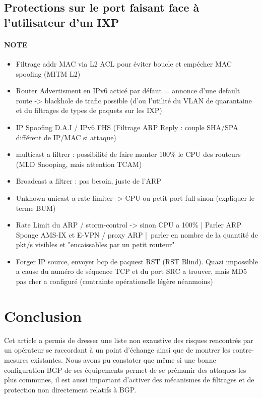 \subsection{Protections sur le port faisant face à l'utilisateur d'un IXP}

\paragraph{NOTE}
\begin{itemize}
\item Filtrage addr MAC via L2 ACL pour éviter boucle et empécher MAC spoofing (MITM L2)
\item Router Advertisment en IPv6 acticé par défaut = annonce d'une default route -> blackhole de trafic possible (d'ou l'utilité du VLAN de quarantaine et du filtrages de types de paquets sur les IXP)
\item IP Spoofing D.A.I / IPv6 FHS (Filtrage ARP Reply : couple SHA/SPA différent de IP/MAC si attaque)
\item multicast a filtrer : possibilité de faire monter 100\% le CPU des routeurs (MLD Snooping, mais attention TCAM)
\item Broadcast a filtrer : pas besoin, juste de l'ARP
\item Unknown unicast a rate-limiter -> CPU ou petit port full sinon (expliquer le terme BUM)
\item Rate Limit du ARP / storm-control  -> sinon CPU a 100\% | Parler ARP Sponge AMS-IX et E-VPN / proxy ARP | parler en nombre de la quantité de pkt/s visibles et "encaissables par un petit routeur"
\item Forger IP source, envoyer bcp de paquest RST (RST Blind). Quazi impossible a cause du numéro de séquence TCP et du port SRC a trouver, mais MD5 pas cher a configuré (contrainte opérationelle légère néanmoins)

\end{itemize}


\section{Conclusion}

Cet article a permis de dresser une liste non exaustive des risques rencontrés par un opérateur se raccordant à un point d'échange ainsi que de montrer les contre-mesures existantes.
Nous avons pu constater que même si une bonne configuration BGP de ses équipements permet de se prémunir des attaques les plus communes, il est aussi important d'activer des mécanismes de filtrages et de protection non directement relatifs à BGP.

